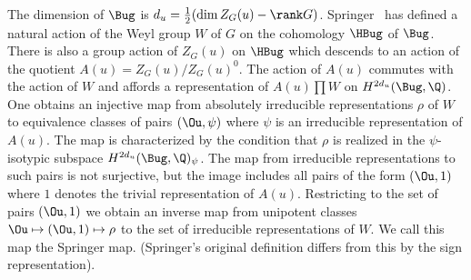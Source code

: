 The dimension of $\Bug$ is $d_u = \frac 12(\dim Z_G(u) - \rank
G)$.  
Springer~ has defined a natural action of
the Weyl 
group $W$ of $G$ on the 
cohomology $\HBug$ of $\Bug$.  There is also a group action of
$Z_G(u)$ on
$\HBug$ which descends to an action of the quotient 
$A(u) = Z_G(u) / Z_G(u)^0$.  The action of $A(u)$ commutes with
the action
of $W$ and affords a representation of $A(u) \prod W$ on
$H^{2d_u}(\Bug,\Q)$.  One obtains an injective map from
absolutely irreducible representations $\rho$ of $W$ to
equivalence classes of pairs $(\Ou,\psi)$ where $\psi$ is an
irreducible representation of $A(u)$.  The map is characterized
by the condition that $\rho$ is realized in the $\psi$-isotypic
subspace $H^{2d_u}(\Bug,\Q)_\psi$.  The map from irreducible
representations to such pairs is not surjective, but the image
includes all pairs of the form $(\Ou,1)$ where $1$ denotes the
trivial representation of $A(u)$.  Restricting to the set of
pairs $(\Ou,1)$ we obtain an inverse map from unipotent classes
$\Ou \mapsto (\Ou,1) \mapsto \rho$ to the set of irreducible
representations of $W$.  We call this map the Springer map. 
(Springer's original definition differs from this by the sign
representation).




\newpage


\bigskip


